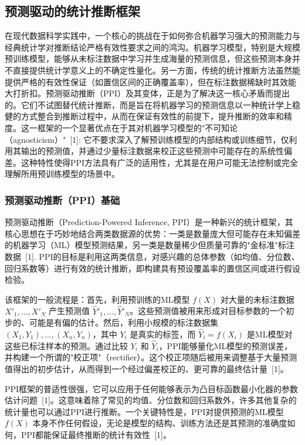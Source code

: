 \documentclass[12pt,a4paper]{article}
\begin{document}
\subsection{预测驱动的统计推断框架}
\label{sec:ppi_framework}
在现代数据科学实践中，一个核心的挑战在于如何弥合机器学习强大的预测能力与经典统计学对推断结论严格有效性要求之间的鸿沟。机器学习模型，特别是大规模预训练模型，能够从未标注数据中学习并生成海量的预测信息，但这些预测本身并不直接提供统计学意义上的不确定性量化。另一方面，传统的统计推断方法虽然能提供严格的有效性保证（如置信区间的正确覆盖率），但在标注数据稀缺时其效能大打折扣。预测驱动推断（PPI）及其变体，正是为了解决这一核心矛盾而提出的。它们不试图替代统计推断，而是旨在将机器学习的预测信息以一种统计学上稳健的方式整合到推断过程中，从而在保证有效性的前提下，提升推断的效率和精度。这一框架的一个显著优点在于其对机器学习模型的"不可知论（agnosticism）"~{[1]}: 它不要求深入了解预训练模型的内部结构或训练细节，仅利用其输出的预测值，并通过少量标注数据来校正这些预测中可能存在的系统性偏差。这种特性使得PPI方法具有广泛的适用性，尤其是在用户可能无法控制或完全理解所用预训练模型的场景中。

\subsubsection{预测驱动推断（PPI）基础}
\label{sec:ppi_basics}
预测驱动推断（Prediction-Powered Inference, PPI）是一种新兴的统计框架，其核心思想在于巧妙地结合两类数据源的优势：一类是数量庞大但可能存在未知偏差的机器学习（ML）模型预测结果，另一类是数量稀少但质量可靠的"金标准"标注数据~{[1]}. PPI的目标是利用这两类信息，对感兴趣的总体参数（如均值、分位数、回归系数等）进行有效的统计推断，即构建具有预设覆盖率的置信区间或进行假设检验。

该框架的一般流程是：首先，利用预训练的ML模型 $f(X)$ 对大量的未标注数据 $X'_1, \dots, X'_N$ 产生预测值 $\hat{Y}'_1, \dots, \hat{Y}'_N$。这些预测值被用来形成对目标参数的一个初步的、可能是有偏的估计。然后，利用小规模的标注数据集 $(X_1,Y_1), \dots, (X_n,Y_n)$，其中 $Y_i$ 是真实的标签，而 $\hat{Y}_i=f(X_i)$ 是ML模型对这些已标注样本的预测。通过比较 $Y_i$ 和 $\hat{Y}_i$，PPI能够量化ML模型的预测误差，并构建一个所谓的"校正项"（rectifier）。这个校正项随后被用来调整基于大量预测值得出的初步估计，从而得到一个经过偏差校正的、更可靠的最终估计量~{[1]}。

PPI框架的普适性很强，它可以应用于任何能够表示为凸目标函数最小化器的参数估计问题~{[1]}。这意味着除了常见的均值、分位数和回归系数外，许多其他复杂的统计量也可以通过PPI进行推断。一个关键特性是，PPI对提供预测的ML模型 $f(X)$ 本身不作任何假设，无论是模型的结构、训练方法还是其预测的准确度如何，PPI都能保证最终推断的统计有效性~{[1]}。
\end{document}
